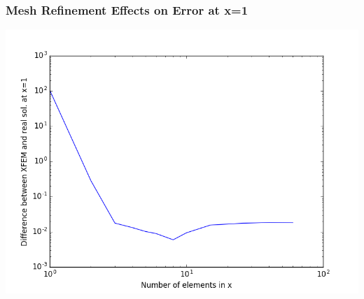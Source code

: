\documentclass[]{beamer}
\begin{document}
\begin{frame}[t]\frametitle{Mesh Refinement Effects on Error at x=1}
	\begin{center}
		\includegraphics[scale=0.4]{figures/1D_rz_homog1mat_neumann_comp}
	\end{center}
\end{frame}
\end{document}
